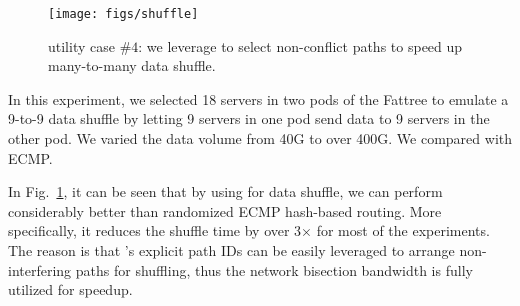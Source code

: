 \begin{figure}[t]
\centering
\texttt{[image: figs/shuffle]}
\vspace{-0.2in}
\caption{\sys utility case $\#4$: we leverage \sys to select non-conflict paths to speed up many-to-many data shuffle.}
\label{fig:shuffle}
\vspace{-0.2in}
\end{figure}

In this experiment, we selected 18 servers in two pods of the Fattree to emulate a 9-to-9 data shuffle by letting 9 servers in one pod send data to 9 servers in the other pod. We varied the data volume from 40G to over 400G. We compared \sys with ECMP.

In Fig.~\ref{fig:shuffle}, it can be seen that by using \sys for data shuffle, we can perform considerably better than randomized ECMP hash-based routing. More specifically, it reduces the shuffle time by over 3$\times$ for most of the experiments. The reason is that \sys's explicit path IDs can be easily leveraged to arrange non-interfering paths for shuffling, thus the network bisection bandwidth is fully utilized for speedup.




